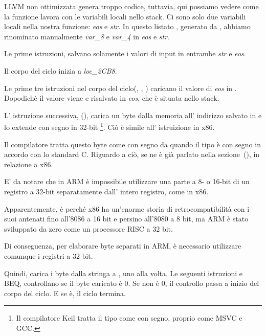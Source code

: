 ﻿

\mysubparagraph{\NonOptimizingXcodeIV (\ARMMode)}



LLVM non ottimizzata genera troppo codice, tuttavia, qui possiamo vedere come la funzione lavora con 
le variabili locali nello stack.
Ci sono solo due variabili locali nella nostra funzione: \emph{eos} e \emph{str}.
In questo listato , generato da \IDA, abbiamo rinominato manualmente \emph{var\_8} e \emph{var\_4} in \emph{eos} e \emph{str}.

Le prime istruzioni, salvano solamente i valori di input in entrambe \emph{str} e \emph{eos}.

Il corpo del ciclo inizia a \emph{loc\_2CB8}.

Le prime tre istruzioni nel corpo del ciclo(, \ADD, ) caricano il valore di \emph{eos} in . 
Dopodichè il valore viene  e risalvato in \emph{eos}, che è situata nello stack.

L' istruzione successiva,   (), carica un byte dalla memoria all' indirizzo salvato in  e lo extende con segno in 32-bit
\footnote{Il compilatore Keil tratta il tipo \Tchar come con segno, proprio come MSVC e GCC.}.
Ciò è simile all' istruizione \MOVSX in x86.

Il compilatore tratta questo byte come con segno da quando il tipo \Tchar è con segno in accordo con lo standard C.
Riguardo a ciò, se ne è già parlato nella sezione~(), in relazione a x86.


E' da notare che in ARM è impossibile utilizzare una parte a 8- o 16-bit  
di un registro a 32-bit separatamente dall' intero registro,
come in x86.

Apparentemente, è perché x86 ha un'enorme storia di retrocompatibilità con i suoi antenati
 fino all'8086 a 16 bit e persino all'8080 a 8 bit,
 ma ARM è stato sviluppato da zero come un processore RISC a 32 bit.

Di conseguenza, per elaborare byte separati in ARM, è necessario utilizzare comunque i registri a 32 bit.

Quindi,  carica i byte dalla stringa a , uno alla volta.
Le seguenti istruzioni \CMP e \ac{BEQ}, controllano se il byte caricato è 0.
Se non è 0, il controllo passa a inizio del corpo del ciclo.
E se è, il ciclo termina.

